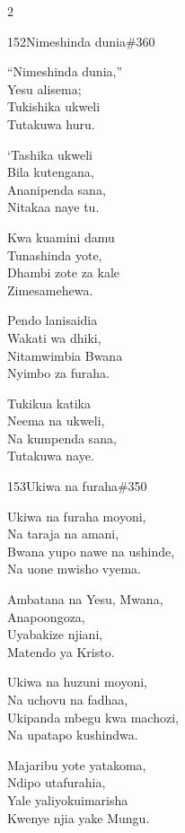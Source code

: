 \begin{multicols}{2}
\begin{hymn}{152}{Nimeshinda dunia}{\#360}
\begin{stanza}
``Nimeshinda dunia,''\\
Yesu alisema;\\
Tukishika ukweli\\
Tutakuwa huru.
\end{stanza}
\begin{chorus}
`Tashika ukweli\\
Bila kutengana,\\
Ananipenda sana,\\
Nitakaa naye tu.
\end{chorus}
\begin{stanza}
Kwa kuamini damu\\
Tunashinda yote,\\
Dhambi zote za kale\\
Zimesamehewa.
\end{stanza}
\begin{stanza}
Pendo lanisaidia\\
Wakati wa dhiki,\\
Nitamwimbia Bwana\\
Nyimbo za furaha.
\end{stanza}
\begin{stanza}
Tukikua katika\\
Neema na ukweli,\\
Na kumpenda sana,\\
Tutakuwa naye.
\end{stanza}
\end{hymn}

\begin{hymn}{153}{Ukiwa na furaha}{\#350}
\begin{stanza}
Ukiwa na furaha moyoni,\\
Na taraja na amani,\\
Bwana yupo nawe na ushinde,\\
Na uone mwisho vyema.
\end{stanza}
\begin{chorus}
Ambatana na Yesu, Mwana,\\
Anapoongoza,\\
Uyabakize njiani,\\
Matendo ya Kristo.
\end{chorus}
\begin{stanza}
Ukiwa na huzuni moyoni,\\
Na uchovu na fadhaa,\\
Ukipanda mbegu kwa machozi,\\
Na upatapo kushindwa.
\end{stanza}
\begin{stanza}
Majaribu yote yatakoma,\\
Ndipo utafurahia,\\
Yale yaliyokuimarisha\\
Kwenye njia yake Mungu.
\end{stanza}
\end{hymn}


\end{multicols}
